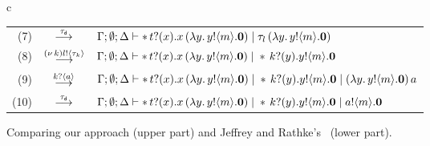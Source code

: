 \begin{example}
\begin{figure}
\begin{tabular}{c}
\begin{tabular}{rcl}
		(7) &$\stackrel{\tau_{\mathsf{d}}}{\longrightarrow}$& $\Gamma; \emptyset; \Delta \vdash \ast\,{} t ? (x) . x\, {(}\lambda y.\,y ! \langle m \rangle . \mathbf{0}) \;|\; \tau_l\, {(\lambda y.\,y ! \langle m \rangle . \mathbf{0})}$\\
		(8) &$\stackrel{(\nu\, k) l ! \langle \tau_k \rangle}{\longrightarrow}$& $\Gamma; \emptyset; \Delta \vdash \ast\,{} t ? (x) . x\, {(}\lambda y.\,y ! \langle m \rangle . \mathbf{0}) \;|\; \ast\,{} k ? (y) . y ! \langle m \rangle . \mathbf{0} $\\
		(9) &$\stackrel{k ? \langle a \rangle}{\longrightarrow}$& $\Gamma; \emptyset; \Delta \vdash \ast\,{} t ? (x) . x\, {(}\lambda y.\,y ! \langle m \rangle . \mathbf{0}) \;|\; \ast\,{} k ? (y) . y ! \langle m \rangle . \mathbf{0} \;|\; (\lambda y.\,y ! \langle m \rangle . \mathbf{0})\, {a}$\\
		(10) &$\stackrel{\tau_{\mathsf{d}}}{\longrightarrow}$& $\Gamma; \emptyset; \Delta \vdash \ast\,{} t ? (x) . x\, {(}\lambda y.\,y ! \langle m \rangle . \mathbf{0}) \;|\; \ast\,{} k ? (y) . y ! \langle m \rangle . \mathbf{0} \;|\; a ! \langle m \rangle . \mathbf{0}$
	\end{tabular}
	\end{tabular}
\caption{Comparing our approach (upper part) and Jeffrey and Rathke's~\cite{JeffreyR05} (lower part).\label{f:comparison} }
\end{figure}


\end{example}
